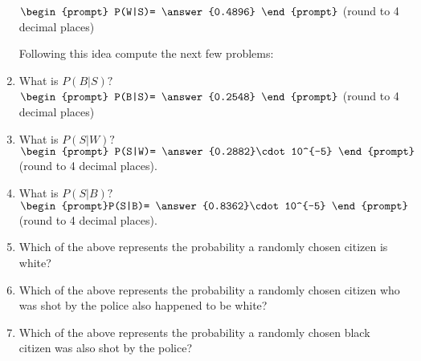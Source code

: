\documentclass{ximera}
\begin{document}
\begin{question}
\begin{enumerate}
$\begin{prompt}
    P(W|S)= \answer{0.4896}
  \end{prompt}$ (round to 4 decimal places)
  
  Following this idea compute the next few problems:
  
  
\item What is  $P(B|S)?$ $\begin{prompt}
    P(B|S)= \answer{0.2548}
  \end{prompt}$ (round to 4 decimal places)

\item What is $P(S|W)?$ $\begin{prompt} P(S|W)= \answer{0.2882}\cdot 10^{-5} \end{prompt}$ (round to 4 decimal places).
\item What is $P(S|B)?$ $\begin{prompt}P(S|B)= \answer{0.8362}\cdot 10^{-5} \end{prompt}$ (round to 4 decimal places).

\item Which of the above represents the probability a randomly chosen citizen is white?

  \begin{multipleChoice}
  \end{multipleChoice}

\item Which of the above represents the probability a randomly chosen citizen who was shot by the police also happened to be white?

  \begin{multipleChoice}
  \end{multipleChoice}

\item Which of the above represents the probability a randomly chosen black citizen  was also  shot by the police?

  \begin{multipleChoice}
  \end{multipleChoice}
  
\end{enumerate}

\end{question}
\end{document}
